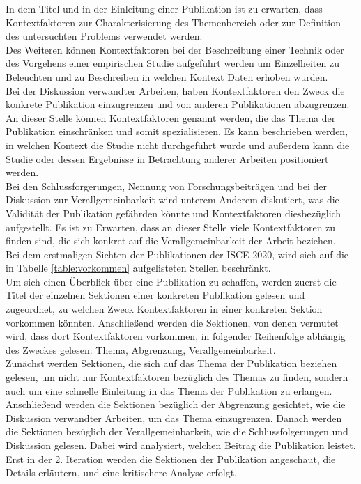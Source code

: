 In dem Titel und in der Einleitung einer Publikation ist zu erwarten, dass Kontextfaktoren zur Charakterisierung des Themenbereich oder zur Definition des untersuchten Problems verwendet werden. \\
Des Weiteren können Kontextfaktoren bei der Beschreibung einer Technik oder des Vorgehens einer empirischen Studie aufgeführt werden um Einzelheiten zu Beleuchten und zu Beschreiben in welchen Kontext Daten erhoben wurden. \\
Bei der Diskussion verwandter Arbeiten, haben Kontextfaktoren den Zweck die konkrete Publikation einzugrenzen und von anderen Publikationen abzugrenzen. An dieser Stelle können Kontextfaktoren genannt werden, die das Thema der Publikation einschränken und somit spezialisieren. Es kann beschrieben werden, in welchen Kontext die Studie nicht durchgeführt wurde und außerdem kann die Studie oder dessen Ergebnisse in Betrachtung anderer Arbeiten positioniert werden. \\
Bei den Schlussforgerungen, Nennung von Forschungsbeiträgen und bei der Diskussion zur Verallgemeinbarkeit wird unterem Anderem diskutiert, was die Validität der Publikation gefährden könnte und Kontextfaktoren diesbezüglich aufgestellt. Es ist zu Erwarten, dass an dieser Stelle viele Kontextfaktoren zu finden sind, die sich konkret auf die Verallgemeinbarkeit der Arbeit beziehen. \\





Bei dem erstmaligen Sichten der Publikationen der ISCE 2020, wird sich auf die in Tabelle  \ref{table:vorkommen} aufgelisteten Stellen beschränkt. \\
Um sich einen Überblick über eine Publikation zu schaffen, werden zuerst die Titel der einzelnen Sektionen einer konkreten Publikation gelesen und zugeordnet, zu welchen Zweck Kontextfaktoren in einer konkreten Sektion vorkommen könnten. Anschließend werden die Sektionen, von denen vermutet wird, dass dort Kontextfaktoren vorkommen, in folgender Reihenfolge abhängig des Zweckes gelesen: Thema, Abgrenzung, Verallgemeinbarkeit. \\
Zunächst werden Sektionen, die sich auf das Thema der Publikation beziehen gelesen, um nicht nur Kontextfaktoren bezüglich des Themas zu finden, sondern auch um eine schnelle Einleitung in das Thema der Publikation zu erlangen. Anschließend werden die Sektionen bezüglich der Abgrenzung gesichtet, wie die Diskussion verwandter Arbeiten, um das Thema einzugrenzen. Danach werden die Sektionen bezüglich der Verallgemeinbarkeit, wie die Schlussfolgerungen und Diskussion gelesen. Dabei wird analysiert, welchen Beitrag die Publikation leistet. Erst in der 2. Iteration werden die Sektionen der Publikation angeschaut, die Details erläutern, und eine kritischere Analyse erfolgt.  \\

